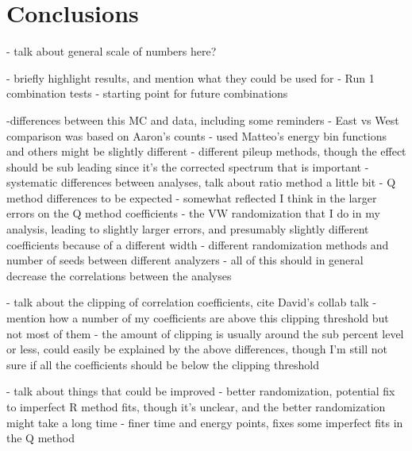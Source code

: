 
\graphicspath{{Body/Figures/}}

\clearpage
\section{Conclusions}

- talk about general scale of numbers here?

- briefly highlight results, and mention what they could be used for
	- Run 1 combination tests
	- starting point for future combinations

	


-differences between this MC and data, including some reminders
 - East vs West comparison was based on Aaron's counts
 - used Matteo's energy bin functions and others might be slightly different
 - different pileup methods, though the effect should be sub leading since it's the corrected spectrum that is important
 - systematic differences between analyses, talk about ratio method a little bit
 - Q method differences to be expected - somewhat reflected I think in the larger errors on the Q method coefficients
 - the VW randomization that I do in my analysis, leading to slightly larger errors, and presumably slightly different coefficients because of a different width
 - different randomization methods and number of seeds between different analyzers
- all of this should in general decrease the correlations between the analyses

- talk about the clipping of correlation coefficients, cite David's collab talk
	- mention how a number of my coefficients are above this clipping threshold but not most of them
	- the amount of clipping is usually around the sub percent level or less, could easily be explained by the above differences, though I'm still not sure if all the coefficients should be below the clipping threshold


- talk about things that could be improved
	- better randomization, potential fix to imperfect R method fits, though it's unclear, and the better randomization might take a long time
	- finer time and energy points, fixes some imperfect fits in the Q method




